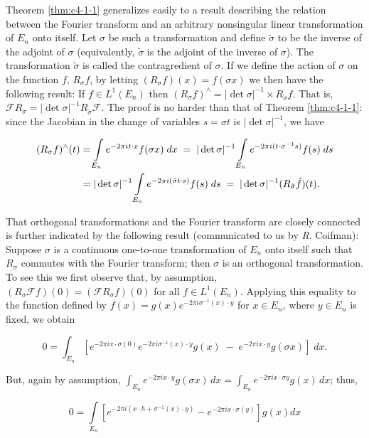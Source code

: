  Theorem \ref{thm:c4-1-1} generalizes easily to a result describing the relation between the Fourier transform and an arbitrary nonsingular linear transformation of $E_n$ onto itself. Let $\sigma$ be such a transformation and define $\tilde{\sigma}$ to be the inverse of the adjoint of $\sigma$ (equivalently, $\tilde{\sigma}$ is the adjoint of the inverse of $\sigma$). The transformation $\tilde{\sigma}$ is called the contragredient of $\sigma$. If we define the action of $\sigma$ on the function $f$, $R_{\sigma}f$, by letting $(R_{\sigma}f)(x) = f(\sigma x)$ we then have the following result: If $f \in L^1(E_n)$ then $(R_{\sigma}f)^\wedge = |\det \sigma|^{-1} \times R_{\tilde{\sigma}} f$. That is, $\mathcal{F} R_{\sigma} = |\det \sigma|^{-1} R_{\tilde{\sigma}} \mathcal{F}$. The proof is no harder than that of Theorem \ref{thm:c4-1-1}: since the Jacobian in the change of variables $s = \sigma t$ is $|\det \sigma|^{-1}$, we have

\[
\begin{aligned}{(R_{\sigma}f)^{\wedge}(t)}&{{}=\intop_{E_{n}}e^{-2\pi i t\cdot x}f(\sigma x)\;{d}x\;=\;|\det\sigma|^{-1}\intop_{E_{n}}e^{-2\pi i(t\cdot\sigma^{-1}s)}f(s)\;{d}s}\\ {}&{{}=|\det\sigma|^{-1}\intop_{E_{n}}e^{-2\pi i(\tilde{\sigma}t\cdot s)}f(s)\;{d}s\;=\;|\det\sigma|^{-1}(R_{\tilde{\sigma}}\hat{f})(t).}\\ \end{aligned}
\]

 That orthogonal transformations and the Fourier transform are closely connected is further indicated by the following result (communicated to us by \textit{R}. Coifman): Suppose $\sigma$ is a continuous one-to-one transformation of $E_n$ onto itself such that $R_\sigma$ commutes with the Fourier transform; then $\sigma$ is an orthogonal transformation. To see this we first observe that, by assumption, $(R_\sigma \mathcal{F} f)(0) = (\mathcal{F} R_\sigma f)(0)$ for all $f \in L^1(E_n)$. Applying this equality to the function defined by $f(x) = g(x)e^{-2\pi i\sigma^{-1}(x) \cdot y}$ for $x \in E_n$, where $y \in E_n$ is fixed, we obtain

\[
0=\int_{E_{n}}[e^{-2\pi i x\cdot\sigma(0)}e^{-2\pi i\sigma^{-1}(x)\cdot y}g(x)\;-\;e^{-2\pi i x\cdot y}g(\sigma x)]\;d x.
\]

But, again by assumption, $\int_{E_n} e^{-2\pi i x \cdot y} g(\sigma x) \, dx = \int_{E_n} e^{-2\pi i x \cdot \sigma y} g(x) \, dx$; thus,

\[
0=\int\limits_{E_{n}}[e^{-2\pi i(x\cdot h+\sigma^{-1}(x)\cdot y)}-e^{-2\pi i x\cdot\sigma(y)}]g(x)d x
\]

